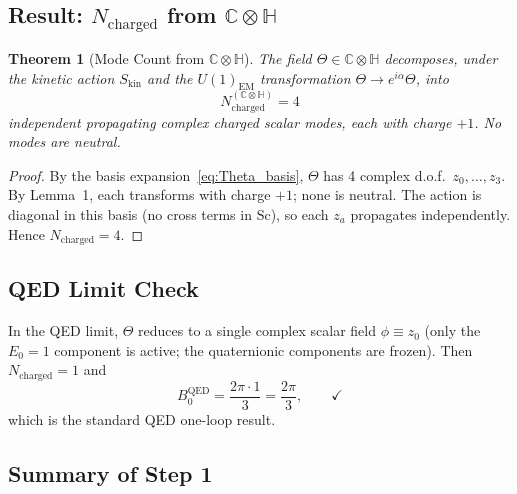 \documentclass[11pt,a4paper]{article}
\newcommand{\C}{\mathbb{C}}
\renewcommand{\H}{\mathbb{H}}
\newcommand{\Sc}{\mathrm{Sc}}
\newtheorem{theorem}{Theorem}
\theoremstyle{remark}
\begin{document}
\subsection{Result: $N_{\mathrm{charged}}$ from $\C \otimes \H$}

\begin{theorem}[Mode Count from $\C \otimes \H$]
\label{thm:Ncharged_CxH}
The field $\Theta \in \C \otimes \H$ decomposes, under the kinetic action $S_{\mathrm{kin}}$
and the $U(1)_{\mathrm{EM}}$ transformation $\Theta \to e^{i\alpha}\Theta$, into
\begin{equation}
  \boxed{N_{\mathrm{charged}}^{(\C\otimes\H)} = 4}
\end{equation}
independent propagating complex charged scalar modes, each with charge $+1$.
No modes are neutral.
\end{theorem}

\begin{proof}
By the basis expansion~\eqref{eq:Theta_basis}, $\Theta$ has 4 complex d.o.f.\ $z_0,\ldots,z_3$.
By Lemma~1, each transforms with charge $+1$; none is neutral.
The action is diagonal in this basis (no cross terms in $\Sc$), so each $z_a$ propagates
independently.  Hence $N_{\mathrm{charged}} = 4$.
\end{proof}

\subsection{QED Limit Check}

In the QED limit, $\Theta$ reduces to a single complex scalar field $\phi \equiv z_0$
(only the $E_0 = 1$ component is active; the quaternionic components are frozen).
Then $N_{\mathrm{charged}} = 1$ and
\begin{equation}
  B_0^{\mathrm{QED}} = \frac{2\pi \cdot 1}{3} = \frac{2\pi}{3}, \qquad \checkmark
  \label{eq:qed_limit_check}
\end{equation}
which is the standard QED one-loop result.

\subsection{Summary of Step 1}
\end{document}

